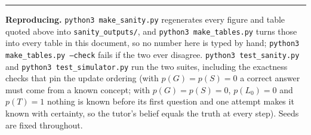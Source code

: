 \documentclass[11pt]{article}
\newcommand{\code}[1]{\texttt{\small #1}}
\begin{document}
\vspace{6pt}
\noindent\rule{\textwidth}{0.4pt}
\vspace{2pt}

\noindent
\footnotesize
\textbf{Reproducing.} \code{python3 make\_sanity.py} regenerates every figure
and table quoted above into \code{sanity\_outputs/}, and \code{python3
make\_tables.py} turns those into every table in this document, so no number
here is typed by hand; \code{python3 make\_tables.py --check} fails if the two
ever disagree. \code{python3 test\_sanity.py} and \code{python3
test\_simulator.py} run the two suites, including the exactness checks that pin
the update ordering (with $p(G)=p(S)=0$ a correct answer must come from a known
concept; with $p(G)=p(S)=0$, $p(L_0)=0$ and $p(T)=1$ nothing is known before its
first question and one attempt makes it known with certainty, so the tutor's
belief equals the truth at every step). Seeds are fixed
throughout.
\end{document}
